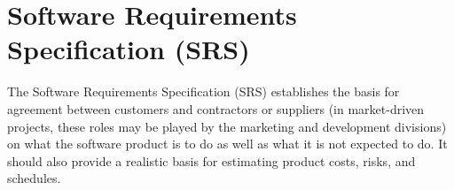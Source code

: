 %
%
%
%
%
\section{Software Requirements Specification (SRS)}

The Software Requirements Specification (SRS) establishes the basis for agreement between customers and
contractors or suppliers (in market-driven projects, these roles may be played by the marketing
and development divisions) on what the software
product is to do as well as what it is not expected
to do. It should also provide a realistic basis for estimating product costs, risks, and schedules.


